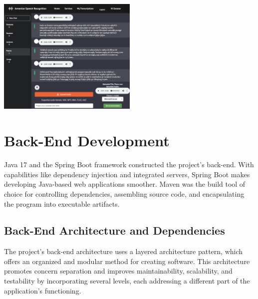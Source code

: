 \documentclass[conference]{IEEEtran}
\begin{document}
\begin{center}
    \includegraphics[width=0.5\textwidth]{PoemsChat.png}
    \label{fig:ui_design_1}
\end{center}












\section{Back-End Development}

Java 17 and the Spring Boot framework constructed the project's back-end. With capabilities like dependency injection and integrated servers, Spring Boot makes developing Java-based web applications smoother. Maven was the build tool of choice for controlling dependencies, assembling source code, and encapsulating the program into executable artifacts.

\subsection{Back-End Architecture and Dependencies}

The project's back-end architecture uses a layered architecture pattern, which offers an organized and modular method for creating software. This architecture promotes concern separation and improves maintainability, scalability, and testability by incorporating several levels, each addressing a different part of the application's functioning.
\end{document}
